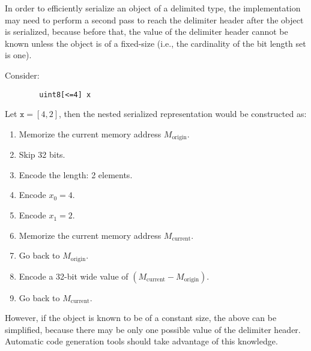\begin{remark}
    In order to efficiently serialize an object of a delimited type,
    the implementation may need to perform a second pass to reach the delimiter header
    after the object is serialized, because before that, the value of the delimiter header cannot be known
    unless the object is of a fixed-size (i.e., the cardinality of the bit length set is one).

    Consider:
    \begin{verbatim}
        uint8[<=4] x
    \end{verbatim}
    Let $\texttt{x} = \left[ 4, 2 \right]$,
    then the nested serialized representation would be constructed as:
    \begin{enumerate}
        \item Memorize the current memory address $M_\text{origin}$.
        \item Skip 32 bits.
        \item Encode the length: 2 elements.
        \item Encode $x_0 = 4$.
        \item Encode $x_1 = 2$.
        \item Memorize the current memory address $M_\text{current}$.
        \item Go back to $M_\text{origin}$.
        \item Encode a 32-bit wide value of $(M_\text{current} - M_\text{origin})$.
        \item Go back to $M_\text{current}$.
    \end{enumerate}

    However, if the object is known to be of a constant size, the above can be simplified,
    because there may be only one possible value of the delimiter header.
    Automatic code generation tools should take advantage of this knowledge.
\end{remark}
